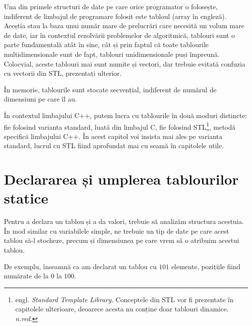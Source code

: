 

Una din primele structuri de date pe care orice programator o folosește, indiferent de limbajul de programare folosit este tabloul (array în engleză). Aceștia stau la baza unui număr mare de prelucrări care necesită un volum mare de date, iar în contextul rezolvării problemelor de algoritmică, tablouri sunt o parte fundamentală atât în sine, cât și prin faptul că toate tablourile multidimensionale sunt de fapt, tablouri unidimensionale puși împreună. Colocvial, aceste tablouri mai sunt numite și vectori, dar trebuie evitată confuzia cu vectorii din STL, prezentați ulterior.

\begin{observation}
În memorie, tablourile sunt stocate secvențial, indiferent de numărul de dimensiuni pe care îl au.
\end{observation}

În contextul limbajului C++, putem lucra cu tablourile în două moduri distincte: fie folosind varianta standard, luată din limbajul C, fie folosind STL\footnote{engl. \textit{Standard Template Library}. Conceptele din STL vor fi prezentate în capitolele ulterioare, deoarece acesta nu conține doar tablouri dinamice. \textit{n.red.}}, metodă specifică limbajului C++. În acest capitol voi insista mai ales pe varianta standard, lucrul cu STL fiind aprofundat mai cu seamă în capitolele utile. 

\section{Declararea și umplerea tablourilor statice}

Pentru a declara un tablou și a da valori, trebuie să analizăm structura acestuia. În mod similar cu variabilele simple, ne trebuie un tip de date pe care acest tablou să-l stocheze, precum și dimensiunea pe care vrem să o atribuim acestui tablou. 

De exemplu,  înseamnă ca am declarat un tablou cu $101$ elemente, pozițiile fiind numărate de la $0$ la $100$.

